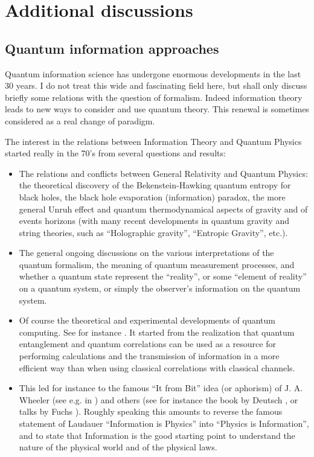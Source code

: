 

\chapter{Additional discussions}
\label{c:misc}
\section{Quantum information approaches}
\label{s:QuanInfo}
Quantum information science has undergone enormous developments in the last 30 years. I do not treat this wide and fascinating field here, but shall only discuss briefly some relations with the question of formalism. Indeed information theory leads to new ways to consider and use  quantum theory. This renewal is sometimes considered as a real change of paradigm.

The interest in the relations between Information Theory and Quantum Physics started really in the 70's from several questions and results:
\begin{itemize}
  \item The relations and conflicts between General Relativity and Quantum Physics: the theoretical discovery of the Bekenstein-Hawking quantum entropy for black holes, the black hole evaporation (information) paradox, the more general Unruh effect and quantum  thermodynamical aspects of gravity and of events horizons (with many recent developments in quantum gravity and string theories, such as ``Holographic gravity'', ``Entropic Gravity'', etc.).
  \item The general ongoing discussions on the various interpretations of the quantum formalism, the meaning of quantum measurement processes, and whether a quantum state represent the ``reality'', or some ``element of reality'' on a quantum system, or simply the observer's information on the quantum system.
  \item Of course the theoretical and experimental developments of quantum computing. See for instance \cite{Nielsen:2010fk}. It started from the realization that quantum entanglement and quantum correlations can be used as a resource for performing calculations and the transmission of information in a more efficient way than when using classical correlations with classical channels.
   \item This led for instance to the famous ``It from Bit'' idea (or aphorism) of J. A. Wheeler (see e.g. in \cite{Zurek:1990fk})
and others (see for instance the book by Deutsch \cite{Deutsch:1997fk}, or talks by Fuchs \cite{Fuchs-2001,Fuchs-2002}). Roughly speaking this amounts to reverse the famous statement of Laudauer ``Information is Physics'' into ``Physics is Information'', and to state that Information is the good starting point to understand the nature of the physical world and of the physical laws. 
\end{itemize}


